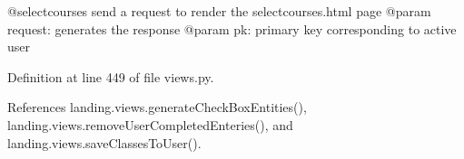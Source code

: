 \begin{DoxyVerb}@selectcourses send a request to render the selectcourses.html page
@param request: generates the response
@param pk: primary key corresponding to active user
\end{DoxyVerb}
 

Definition at line 449 of file views.\+py.



References landing.\+views.\+generate\+Check\+Box\+Entities(), landing.\+views.\+remove\+User\+Completed\+Enteries(), and landing.\+views.\+save\+Classes\+To\+User().

